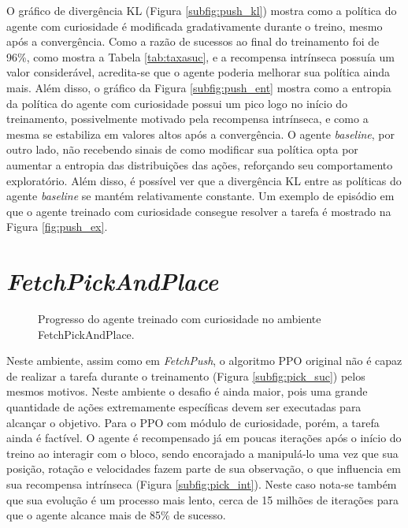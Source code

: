 O gráfico de divergência KL (Figura \ref{subfig:push_kl}) mostra como a política do agente com curiosidade é modificada gradativamente durante o treino, mesmo após a convergência. Como a razão de sucessos ao final do treinamento foi de 96\%, como mostra a Tabela \ref{tab:taxasuc}, e a recompensa intrínseca possuía um valor considerável, acredita-se que o agente poderia melhorar sua política ainda mais. Além disso, o gráfico da Figura \ref{subfig:push_ent} mostra como a entropia da política do agente com curiosidade possui um pico logo no início do treinamento, possivelmente motivado pela recompensa intrínseca, e como a mesma se estabiliza em valores altos após a convergência. O agente \textit{baseline}, por outro lado, não recebendo sinais de como modificar sua política opta por aumentar a entropia das distribuições das ações, reforçando seu comportamento exploratório. Além disso, é possível ver que a divergência KL entre as políticas do agente \textit{baseline} se mantém relativamente constante. Um exemplo de episódio em que o agente treinado com curiosidade consegue resolver a tarefa é mostrado na Figura \ref{fig:push_ex}.


\section{\textit{FetchPickAndPlace}}
\label{sec:pick}

\begin{figure}[h!]
 \centering
   \captionsetup{width=1\textwidth}
   \caption{Progresso do agente treinado com curiosidade no ambiente FetchPickAndPlace.}
  \label{fig:pick_ex}
\end{figure}

Neste ambiente, assim como em \textit{FetchPush}, o algoritmo PPO original não é capaz de realizar a tarefa durante o treinamento (Figura \ref{subfig:pick_suc}) pelos mesmos motivos. Neste ambiente o desafio é ainda maior, pois uma grande quantidade de ações extremamente específicas devem ser executadas para alcançar o objetivo. Para o PPO com módulo de curiosidade, porém, a tarefa ainda é factível. O agente é recompensado já em poucas iterações após o início do treino ao interagir com o bloco, sendo encorajado a manipulá-lo uma vez que sua posição, rotação e velocidades fazem parte de sua observação, o que influencia em sua recompensa intrínseca (Figura \ref{subfig:pick_int}). Neste caso nota-se também que sua evolução é um processo mais lento, cerca de 15 milhões de iterações para que o agente alcance mais de 85\% de sucesso.

